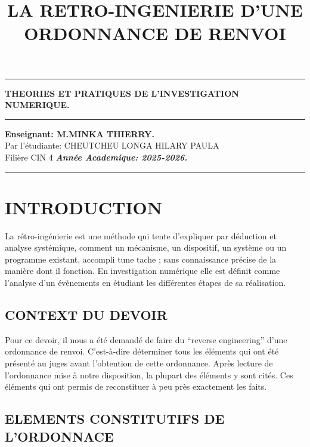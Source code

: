 \documentclass[]{article}
\title{\textbf{LA RETRO-INGENIERIE D’UNE ORDONNANCE DE RENVOI}}
\date{}
\begin{document}
\thispagestyle{empty}
\begin{center}
	\rule{1\textwidth}{2pt}\vspace{\baselineskip}
	\vspace{\baselineskip}\huge\textbf{THEORIES ET PRATIQUES DE L’INVESTIGATION  NUMERIQUE.}
	\rule{1\textwidth}{2pt}\vspace{\baselineskip}
	\vspace{\baselineskip}
	\vfill
	\textbf{Enseignant: M.MINKA THIERRY.}\\
	\vfill
	Par l'étudiante: CHEUTCHEU LONGA HILARY PAULA\\
	Filière CIN 4\vfill
	\vspace{\baselineskip}
	\emph{\textbf{Année Academique: 2025-2026.}}
	\rule{1\textwidth}{2pt}\vspace{\baselineskip}
\end{center}
\maketitle
\section*{INTRODUCTION}
	La rétro-ingénierie est une méthode qui tente d’expliquer par déduction et analyse systémique, comment un mécanisme, un dispositif, un système ou un programme existant, accompli tune tache ; sans connaissance précise de la manière dont il fonction. En investigation numérique elle est définit comme l’analyse d’un évènements en étudiant les différentes étapes de sa réalisation.
	
\subsection*{CONTEXT DU DEVOIR}
	Pour ce devoir, il nous a été demandé de faire du “reverse engineering” d’une ordonnance de renvoi. C’est-à-dire déterminer tous les éléments qui ont été présenté au juges avant l’obtention de cette ordonnance. Après lecture de l’ordonnance mise à notre disposition, la plupart des éléments y sont cités. Ces éléments qui ont permis de reconstituer à peu près exactement les faits. \\

\newpage
\subsection*{ELEMENTS CONSTITUTIFS DE L'ORDONNACE}
\end{document}
